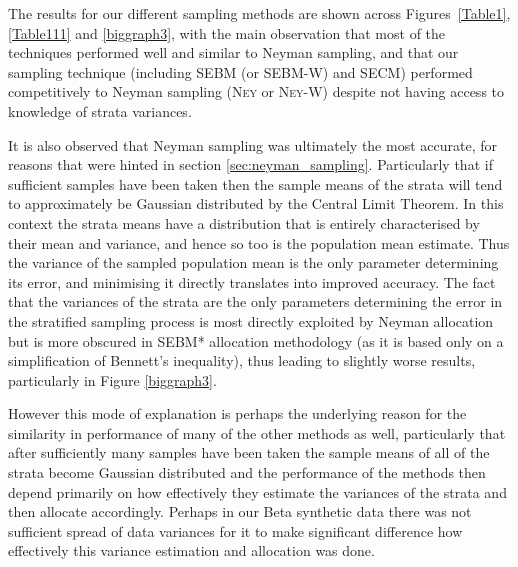 The results for our different sampling methods are shown across Figures~\ref{Table1},\ref{Table111} and \ref{biggraph3}, with the main observation that most of the techniques performed well and similar to Neyman sampling, and that our sampling technique (including SEBM (or SEBM-W) and SECM) performed competitively to Neyman sampling (\textsc{Ney} or \textsc{Ney-W}) despite not having access to knowledge of strata variances.

It is also observed that Neyman sampling was ultimately the most accurate, for reasons that were hinted in section \ref{sec:neyman_sampling}.
Particularly that if sufficient samples have been taken then the sample means of the strata will tend to approximately be Gaussian distributed by the Central Limit Theorem.
In this context the strata means have a distribution that is entirely characterised by their mean and variance, and hence so too is the population mean estimate.
Thus the variance of the sampled population mean is the only parameter determining its error, and minimising it directly translates into improved accuracy.
The fact that the variances of the strata are the only parameters determining the error in the stratified sampling process is most directly exploited by Neyman allocation but is more obscured in SEBM* allocation methodology (as it is based only on a simplification of Bennett's inequality), thus leading to slightly worse results, particularly in Figure \ref{biggraph3}.

However this mode of explanation is perhaps the underlying reason for the similarity in performance of many of the other methods as well, particularly that after sufficiently many samples have been taken the sample means of all of the strata become Gaussian distributed and the performance of the methods then depend primarily on how effectively they estimate the variances of the strata and then allocate accordingly.
Perhaps in our Beta synthetic data there was not sufficient spread of data variances for it to make significant difference how effectively this variance estimation and allocation was done.


